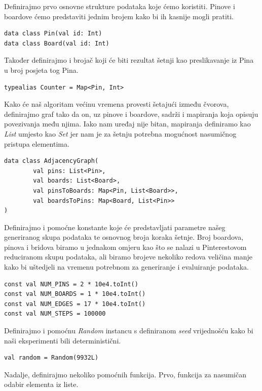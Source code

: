 \documentclass[times, utf8, seminar]{fer}
\begin{document}
Definirajmo prvo osnovne strukture podataka koje ćemo koristiti. Pinove i boardove ćemo predstaviti jednim brojem kako bi ih kasnije mogli pratiti.

\begin{lstlisting}
data class Pin(val id: Int)
data class Board(val id: Int)
\end{lstlisting}

Također definirajmo i brojač koji će biti rezultat šetnji kao preslikavanje iz Pina u broj posjeta tog Pina.

\begin{lstlisting}
typealias Counter = Map<Pin, Int>
\end{lstlisting}

Kako će naš algoritam većinu vremena provesti šetajući između čvorova, definirajmo graf tako da on, uz pinove i boardove, sadrži i mapiranja koja opisuju povezivanja među njima. Iako nam uređaj nije bitan, mapiranja definiramo kao \textit{List} umjesto kao \textit{Set} jer nam je za šetnju potrebna mogućnost nasumičnog pristupa elementima.

\begin{lstlisting}
data class AdjacencyGraph(
        val pins: List<Pin>,
        val boards: List<Board>,
        val pinsToBoards: Map<Pin, List<Board>>,
        val boardsToPins: Map<Board, List<Pin>>
)
\end{lstlisting}

Definirajmo i pomoćne konstante koje će predstavljati parametre našeg generiranog skupa podataka te osnovnog broja koraka šetnje. Broj boardova, pinova i bridova biramo u jednakom omjeru kao što se nalazi u Pinterestovom reduciranom skupu podataka, ali biramo brojeve nekoliko redova veličina manje kako bi uštedjeli na vremenu potrebnom za generiranje i evaluiranje podataka.

\begin{lstlisting}
const val NUM_PINS = 2 * 10e4.toInt()
const val NUM_BOARDS = 1 * 10e4.toInt()
const val NUM_EDGES = 17 * 10e4.toInt()
const val NUM_STEPS = 100000
\end{lstlisting}

Definirajmo i pomoćnu \textit{Random} instancu s definiranom \textit{seed} vrijednošću kako bi naši eksperimenti bili deterministični.

\begin{lstlisting}
val random = Random(9932L)
\end{lstlisting}

Nadalje, definirajmo nekoliko pomoćnih funkcija. Prvo, funkcija za nasumičan odabir elementa iz liste.
\end{document}
